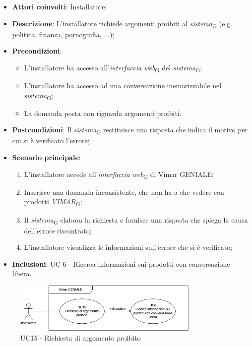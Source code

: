 \begin{itemize}
    \item \textbf{Attori coinvolti}: Installatore;
    \item \textbf{Descrizione}: L’installatore richiede argomenti proibiti al \textit{sistema}\textsubscript{G} (e.g. politica, finanza, pornografia, ...);
    \item \textbf{Precondizioni}: 
        \begin{itemize}
            \item L’installatore ha accesso all’\textit{interfaccia web}\textsubscript{G} del \textit{sistema}\textsubscript{G};
            \item L’installatore ha accesso ad una conversazione memorizzabile nel \textit{sistema}\textsubscript{G};
            \item La domanda posta non riguarda argomenti proibiti.
        \end{itemize}
    \item \textbf{Postcondizioni}: Il \textit{sistema}\textsubscript{G} restituisce una risposta che indica il motivo per cui si è verificato l’errore;
    \item \textbf{Scenario principale}:
    \begin{enumerate}
    \item L’installatore accede all’\textit{interfaccia web}\textsubscript{G} di Vimar GENIALE;
    \item Inserisce una domanda inconsistente, che non ha a che vedere con prodotti \textit{VIMAR}\textsubscript{G};
    \item Il \textit{sistema}\textsubscript{G} elabora la richiesta e fornisce una risposta che spiega la causa dell'errore riscontrato;
    \item L’installatore visualizza le informazioni sull’errore che si è verificato;
    \end{enumerate}
     \item \textbf{Inclusioni}: UC 6 - Ricerca informazioni sui prodotti con conversazione libera.
\end{itemize}
\begin{figure}[H]
\centering
\includegraphics[width=0.8\textwidth]{contents/casi_duso/png/UC15.png}
\caption{UC15 - Richiesta di argomento proibito}
\end{figure}

